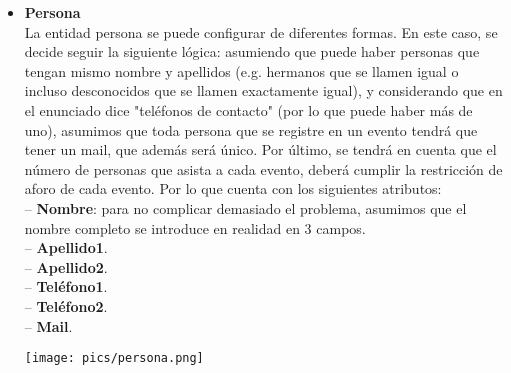 \documentclass[12pt]{article}
\begin{document}
\begin{itemize}
        \item \textbf{Persona}\\
            La entidad persona se puede configurar de diferentes formas. En este caso, se decide seguir la siguiente lógica:
            asumiendo que puede haber personas que tengan mismo nombre y apellidos (e.g. hermanos que se llamen igual o incluso 
            desconocidos que se llamen exactamente igual), y considerando que en el enunciado dice "teléfonos de contacto" (por lo que puede haber más de uno),
            asumimos que toda persona que se registre en un evento tendrá que tener un mail, que además será único. 
            Por último, se tendrá en cuenta que el número de personas que asista a cada evento, deberá cumplir la restricción de aforo de cada evento.
            Por lo que cuenta con los siguientes atributos: \\
                \hspace{0.5cm} -- {\bfseries Nombre}: para no complicar demasiado el problema, asumimos que el nombre completo se introduce en realidad en 3 campos. \\
                \hspace{0.5cm} -- {\bfseries Apellido1}. \\
                \hspace{0.5cm} -- {\bfseries Apellido2}. \\
                \hspace{0.5cm} -- {\bfseries Teléfono1}. \\
                \hspace{0.5cm} -- {\bfseries Teléfono2}. \\
                \hspace{0.5cm} -- {\bfseries Mail}.
            \begin{center}
            {\texttt{[image: pics/persona.png]}}
            \end{center}
        

\end{itemize}
\end{document}
